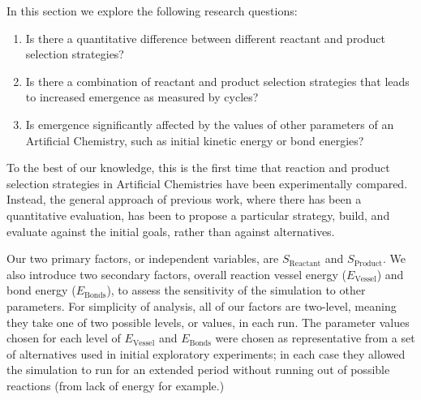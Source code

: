 In this section we explore the following research questions:

\vspace{0.3cm}
\begin{minipage}[l]{0.95\textwidth}
	\begin{enumerate}[label=RQ\arabic*:]
		\item Is there a quantitative difference between different reactant and product selection strategies?
		\item Is there a combination of reactant and product selection strategies that leads to increased emergence as measured by cycles?
		\item Is emergence significantly affected by the values of other parameters of an Artificial Chemistry, such as initial kinetic energy or bond energies?
	\end{enumerate}
\end{minipage}
\vspace{0.3cm}

To the best of our knowledge, this is the first time that reaction and product selection strategies
in Artificial Chemistries have been experimentally compared.
Instead, the general approach of previous work, where there has been a quantitative evaluation,
has been to propose a particular strategy, build, and evaluate against the initial goals,
rather than against alternatives.

Our two primary factors, or independent variables, are $S_\mathrm{Reactant}$ and $S_\mathrm{Product}$.
We also introduce two secondary factors, overall reaction vessel energy ($E_\mathrm{Vessel}$) and
bond energy ($E_\mathrm{Bonds}$), to assess the sensitivity of the simulation to other parameters.
For simplicity of analysis, all of our factors are two-level, meaning they take one of two
possible levels, or values, in each run. The parameter values chosen for each level of
$E_\mathrm{Vessel}$ and $E_\mathrm{Bonds}$ were chosen as representative from a set of alternatives
used in initial exploratory experiments; in each case they allowed the simulation to run for an
extended period without running out of possible reactions (from lack of energy for example.)


